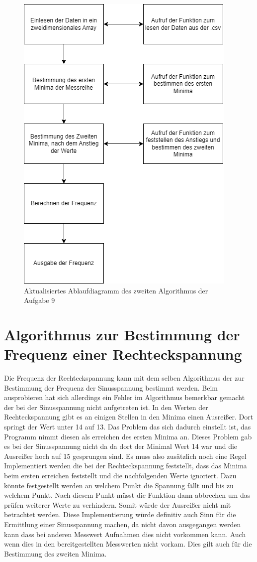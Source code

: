 \begin{figure}[h]
	\centering
	\includegraphics[scale=0.5]{Images/aufgabe9_algo2.1.png}
	\caption{Aktualisiertes Ablaufdiagramm des zweiten Algorithmus der Aufgabe 9}
	\label{algo2.1}
\end{figure}

\section{Algorithmus zur Bestimmung der Frequenz einer Rechteckspannung}
Die Frequenz der Rechteckspannung kann mit dem selben Algorithmus der zur Bestimmung der Frequenz der Sinusspannung bestimmt werden.
Beim ausprobieren hat sich allerdings ein Fehler im Algorithmus bemerkbar gemacht der bei der Sinusspannung nicht aufgetreten ist.
In den Werten der Rechteckspannung gibt es an einigen Stellen in den Minima einen Ausreißer.
Dort springt der Wert unter 14 auf 13. 
Das Problem das sich dadurch einstellt ist, das Programm nimmt diesen als erreichen des ersten Minima an.
Dieses Problem gab es bei der Sinusspannung nicht da da dort der Minimal Wert 14 war und die Ausreißer hoch auf 15 gesprungen sind.
Es muss also zusätzlich noch eine Regel Implementiert werden die bei der Rechteckspannung feststellt, dass das Minima beim ersten erreichen feststellt und die nachfolgenden Werte ignoriert.
Dazu könnte festgestellt werden an welchem Punkt die Spannung fällt und bis zu welchem Punkt.
Nach diesem Punkt müsst die Funktion dann abbrechen um das prüfen weiterer Werte zu verhindern.
Somit würde der Ausreißer nicht mit betrachtet werden.
Diese Implementierung würde definitiv auch Sinn für die Ermittlung einer Sinusspannung machen, da nicht davon ausgegangen werden kann dass bei anderen Messwert Aufnahmen dies nicht vorkommen kann.
Auch wenn dies in den bereitgestellten Messwerten nicht vorkam. 
Dies gilt auch für die Bestimmung des zweiten Minima.


